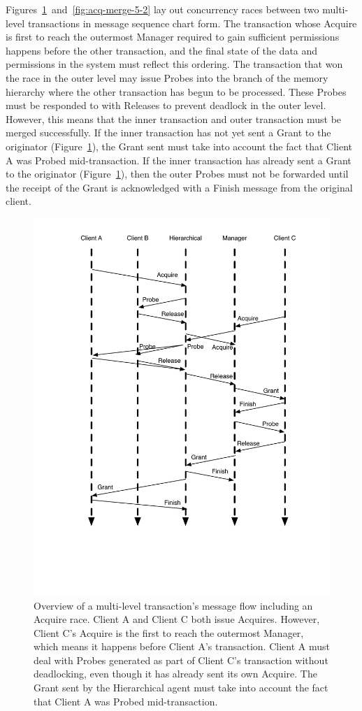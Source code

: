 Figures~\ref{fig:acq-merge-5}~and~\ref{fig:acq-merge-5-2} lay out concurrency races between two multi-level transactions in message sequence chart form.
The transaction whose Acquire is first to reach the outermost Manager required to gain sufficient permissions happens before the other transaction,
and the final state of the data and permissions in the system must reflect this ordering.
The transaction that won the race in the outer level may issue Probes into the branch of the memory hierarchy where the other transaction has begun to be processed.
These Probes must be responded to with Releases to prevent deadlock in the outer level.
However, this means that the inner transaction and outer transaction must be merged successfully.
If the inner transaction has not yet sent a Grant to the originator (Figure~\ref{fig:acq-merge-5}),
the Grant sent must take into account the fact that Client A was Probed mid-transaction.
If the inner transaction has already sent a Grant to the originator (Figure~\ref{fig:acq-merge-5}),
then the outer Probes must not be forwarded until the receipt of the Grant is acknowledged with a Finish message from the original client.

\begin{figure}[t!]
\centering
\includegraphics[width=0.8\columnwidth]{tilelink/figures/acq-merge-5.pdf}
\caption{Overview of a multi-level transaction's message flow including an Acquire race.
Client A and Client C both issue Acquires. However, Client C's Acquire is the first to reach the outermost Manager, which means
it happens before Client A's transaction.
Client A must deal with Probes generated as part of Client C's transaction without deadlocking, even though it has already sent its own Acquire.
The Grant sent by the Hierarchical agent must take into account the fact that Client A was Probed mid-transaction.
}
\label{fig:acq-merge-5}
\end{figure}

